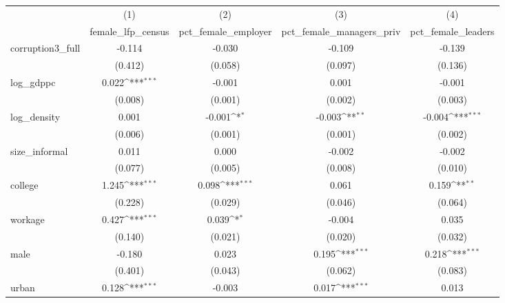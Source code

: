 {
\def\sym#1{\ifmmode^{#1}\else\(^{#1}\)\fi}
\begin{tabular}{l*{4}{c}}
\hline\hline
            &\multicolumn{1}{c}{(1)}&\multicolumn{1}{c}{(2)}&\multicolumn{1}{c}{(3)}&\multicolumn{1}{c}{(4)}\\
            &\multicolumn{1}{c}{female\_lfp\_census}&\multicolumn{1}{c}{pct\_female\_employer}&\multicolumn{1}{c}{pct\_female\_managers\_priv}&\multicolumn{1}{c}{pct\_female\_leaders}\\
\hline
corruption3\_full&      -0.114         &      -0.030         &      -0.109         &      -0.139         \\
            &     (0.412)         &     (0.058)         &     (0.097)         &     (0.136)         \\
[1em]
log\_gdppc   &       0.022\sym{***}&      -0.001         &       0.001         &      -0.001         \\
            &     (0.008)         &     (0.001)         &     (0.002)         &     (0.003)         \\
[1em]
log\_density &       0.001         &      -0.001\sym{*}  &      -0.003\sym{**} &      -0.004\sym{***}\\
            &     (0.006)         &     (0.001)         &     (0.001)         &     (0.002)         \\
[1em]
size\_informal&       0.011         &       0.000         &      -0.002         &      -0.002         \\
            &     (0.077)         &     (0.005)         &     (0.008)         &     (0.010)         \\
[1em]
college     &       1.245\sym{***}&       0.098\sym{***}&       0.061         &       0.159\sym{**} \\
            &     (0.228)         &     (0.029)         &     (0.046)         &     (0.064)         \\
[1em]
workage     &       0.427\sym{***}&       0.039\sym{*}  &      -0.004         &       0.035         \\
            &     (0.140)         &     (0.021)         &     (0.020)         &     (0.032)         \\
[1em]
male        &      -0.180         &       0.023         &       0.195\sym{***}&       0.218\sym{***}\\
            &     (0.401)         &     (0.043)         &     (0.062)         &     (0.083)         \\
[1em]
urban       &       0.128\sym{***}&      -0.003         &       0.017\sym{***}&       0.013         \\

\end{tabular}}
